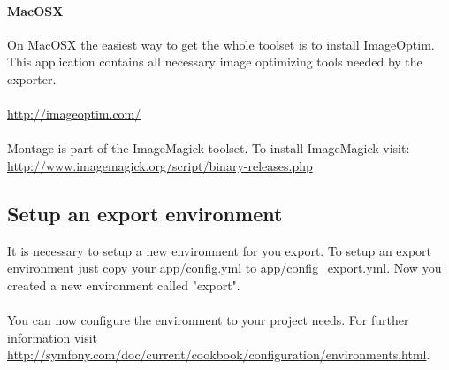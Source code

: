 \paragraph{MacOSX\\}
\noindent On MacOSX the easiest way to get the whole toolset is to install ImageOptim. This application contains all necessary image optimizing tools needed by the exporter.\\
\\
\url{http://imageoptim.com/}\\
\\
Montage is part of the ImageMagick toolset. To install ImageMagick visit:\\
\url{http://www.imagemagick.org/script/binary-releases.php}\\

\subsection{Setup an export environment}

It is necessary to setup a new environment for you export. To setup an export environment just copy your app/config.yml to app/config\_export.yml. Now you created a new environment called "export". \\
\\
You can now configure the environment to your project needs. For further information visit \url{http://symfony.com/doc/current/cookbook/configuration/environments.html}.\\
